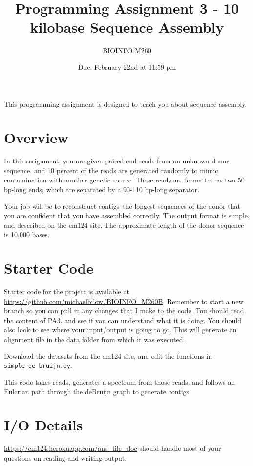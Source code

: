 \documentclass{article}
\begin{document}
\title{Programming Assignment 3 - 10 kilobase Sequence Assembly}

\author{BIOINFO M260}

\date{Due: February 22nd at 11:59 pm}

\maketitle

This programming assignment is designed to teach you about sequence assembly.

\section*{Overview}
In this assignment, you are given paired-end reads from an unknown donor sequence, and 10 percent of the reads are generated randomly to mimic contamination with another genetic source. These reads are formatted as two 50 bp-long ends, which are separated by a 90-110 bp-long separator. 

Your job will be to reconstruct contigs--the longest sequences of the donor that you are confident that you have assembled correctly. The output format is simple, and described on the cm124 site. The approximate length of the donor sequence is 10,000 bases.

\section*{Starter Code}

Starter code for the project is available at \url{https://github.com/michaelbilow/BIOINFO_M260B}. Remember to start a new branch so you can pull in any changes that I make to the code. Tou should read the content of PA3, and see if you can understand what it is doing. You should also look to see where your input/output is going to go. This will generate an alignment file in the data folder from which it was executed.

Download the datasets from the cm124 site, and edit the functions in \verb|simple_de_bruijn.py|.

This code takes reads, generates a spectrum from those reads, and follows an Eulerian path through the deBruijn graph to generate contigs.
 

\section*{I/O Details}
\url{https://cm124.herokuapp.com/ans_file_doc} should handle most of your questions on reading and writing output.
\end{document}
